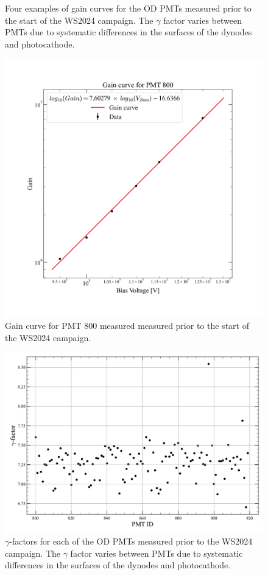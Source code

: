 \begin{figure}[ht!]
\begin{subfigure}[b]{0.47\textwidth}
     \end{subfigure}
        \caption{Four examples of gain curves for the OD PMTs measured prior to the start of the WS2024 campaign. The $\gamma$ factor varies between PMTs due to systematic differences in the surfaces of the dynodes and photocathode.}
        \label{fig:ODCommissioning/gainCurve}
\end{figure}
\fi

\begin{figure}[ht!]
    \centering
    \includegraphics[width=0.8\linewidth]{figures/ODCommissioning/PMT800_GainCurve.png}
    \caption{Gain curve for PMT 800 measured measured prior to the start of the WS2024 campaign.}
    \label{fig:ODCommissioning/PMT800_gainCurve}
\end{figure}

\begin{figure}[ht!]
    \centering
    \includegraphics[width=0.8\linewidth]{figures/ODCommissioning/gammaFactorScatterPlot.pdf}
    \caption{$\gamma$-factors for each of the OD PMTs measured prior to the WS2024 campaign. The $\gamma$ factor varies between PMTs due to systematic differences in the surfaces of the dynodes and photocathode.}
    \label{fig:ODCommissioning/gammaFactors}
\end{figure}

